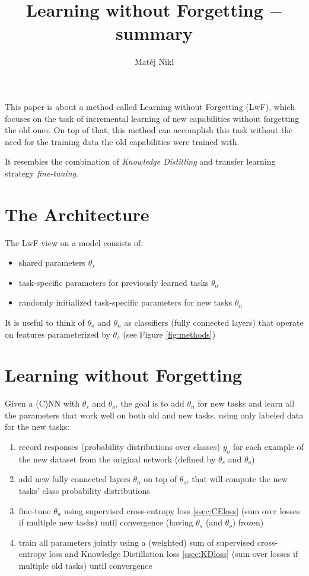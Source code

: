\documentclass[a4paper,twocolumn]{article}
\title{Learning without Forgetting $-$ summary}
\author{Matěj Nikl}
\begin{document}
\maketitle
This paper is about a method called Learning without Forgetting (LwF), which focuses on the task of incremental learning of new capabilities without forgetting the old ones. On top of that, this method can accomplish this task without the need for the training data the old capabilities were trained with.

It resembles the combination of \textit{Knowledge Distilling} and transfer learning strategy \textit{fine-tuning}.

\section{The Architecture}
The LwF view on a model consists of:
\begin{itemize}
    \item shared parameters $\theta_s$
    \item task-specific parameters for previously learned tasks $\theta_o$
    \item randomly initialized task-specific parameters for new tasks $\theta_n$
\end{itemize}
It is useful to think of $\theta_o$ and $\theta_n$ as classifiers (fully connected layers) that operate on features parameterized by $\theta_s$ (see Figure \ref{fig:methods})

\section{Learning without Forgetting}
Given a (C)NN with $\theta_s$ and $\theta_o$, the goal is to add $\theta_n$ for new tasks and learn all the parameters that work well on both old and new tasks, using only labeled data for the new tasks:
\begin{enumerate}
    \item record responses (probability distributions over classes) $y_o$ for each example of the new dataset from the original network (defined by $\theta_s$ and $\theta_o$)
    \item add new fully connected layers $\theta_n$ on top of $\theta_s$, that will compute the new tasks' class probability distributions
    \item fine-tune $\theta_n$ using supervised cross-entropy loss \ref{ssec:CEloss} (sum over losses if multiple new tasks) until convergence (having $\theta_s$ (and $\theta_o$) frozen)
    \item train all parameters jointly using a (weighted) sum of supervised cross-entropy loss and Knowledge Distillation loss \ref{ssec:KDloss} (sum over losses if multiple old tasks) until convergence
\end{enumerate}
\end{document}
